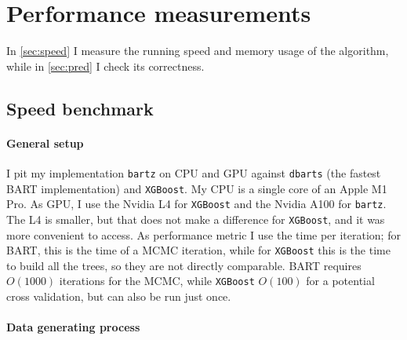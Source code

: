 \documentclass{article}
\let\oldmarginpar\marginpar
\renewcommand{\marginpar}[1]{\oldmarginpar{\sffamily\scriptsize #1}}
\renewcommand{\marginpar}[1]{\relax} %
\begin{document}
    \section{Performance measurements}
    \label{sec:perf}

    In \autoref{sec:speed} I measure the running speed and memory usage of the algorithm, while in \autoref{sec:pred} I check its correctness.

    \subsection{Speed benchmark}
    \label{sec:speed}

    \paragraph{General setup}

    I pit my implementation \texttt{bartz} on CPU and GPU against \texttt{dbarts} (the fastest BART implementation) and \texttt{XGBoost}.\marginpar{Add XBART} My CPU is a single core of an Apple M1 Pro. As GPU, I use the Nvidia L4 for \texttt{XGBoost} and the Nvidia A100 for \texttt{bartz}. The L4 is smaller, but that does not make a difference for \texttt{XGBoost}, and it was more convenient to access. As performance metric I use the time per iteration; for BART, this is the time of a MCMC iteration, while for \texttt{XGBoost} this is the time to build all the trees, so they are not directly comparable. BART requires $O(1000)$ iterations for the MCMC, while \texttt{XGBoost} $O(100)$ for a potential cross validation, but can also be run just once.

    \paragraph{Data generating process}
\end{document}

